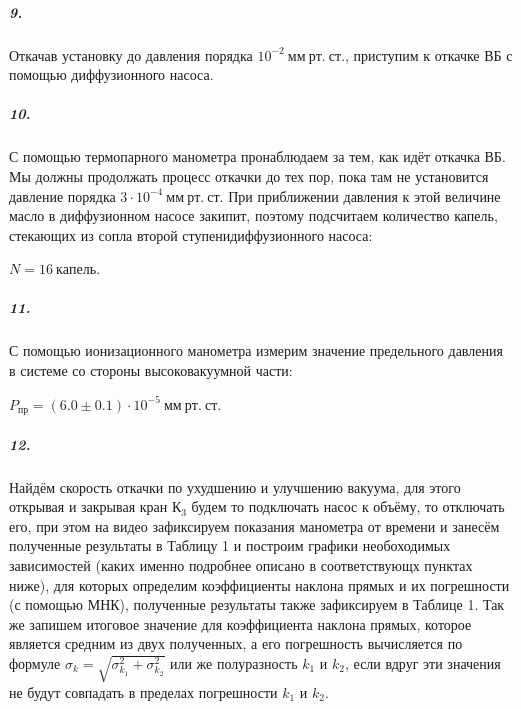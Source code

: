 \documentclass[a4paper,12pt]{article}
\begin{document}
\subparagraph*{9.} Откачав установку до давления порядка $ 10^{-2}~мм~рт.~ ст.$, приступим к откачке ВБ с помощью диффузионного насоса. 


\subparagraph*{10.} С помощью термопарного манометра пронаблюдаем за тем, как идёт откачка ВБ. Мы должны продолжать процесс откачки до тех пор, пока там не установится давление порядка $3 \cdot 10^{-4}~мм~рт.~ ст.$ При приближении давления к этой величине масло в диффузионном насосе закипит, поэтому подсчитаем количество капель, стекающих из сопла второй ступенидиффузионного насоса: 

$
N = 16 ~ капель. 
$


\subparagraph*{11.} С помощью ионизационного манометра измерим значение предельного давления в системе со стороны высоковакуумной части: 

$
P_{пр} = (6.0 \pm 0.1)  \cdot 10^{-5} ~мм ~рт. ~ст.
$


\subparagraph*{12.} Найдём скорость откачки по ухудшению и улучшению вакуума, для этого открывая и закрывая кран $К_3$ будем то подключать насос к объёму, то отключать его, при этом на видео зафиксируем показания манометра от времени и занесём полученные результаты в Таблицу 1 и построим графики необоходимых  зависимостей (каких именно подробнее описано в соответствующх пунктах ниже), для которых определим коэффициенты наклона прямых и их погрешности (с помощью МНК), полученные результаты также зафиксируем в Таблице 1. Так же запишем итоговое значение для коэффициента наклона прямых, которое является средним из двух полученных, а его погрешность вычисляется по формуле $\sigma_k = \sqrt{\sigma_{k_1}^2 + \sigma_{k_2}^2}$ или же полуразность $k_1$ и  $k_2$, если вдруг эти значения не будут совпадать в пределах погрешности $k_1$ и $k_2$.
\end{document}
